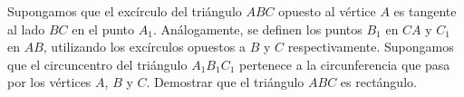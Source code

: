 Supongamos que el excírculo del triángulo $ABC$ opuesto al vértice $A$ es tangente al lado $BC$ en el punto $A_1$. Análogamente, se definen los puntos $B_1$ en $CA$ y $C_1$ en $AB$, utilizando los excírculos opuestos a $B$ y $C$ respectivamente. Supongamos que el circuncentro del triángulo $A_1B_1C_1$ pertenece a la circunferencia que pasa por los vértices $A$, $B$ y $C$. Demostrar que el triángulo $ABC$ es rectángulo.
